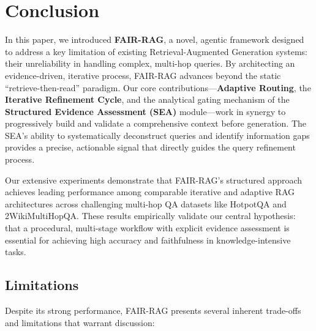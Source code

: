 \documentclass[11pt]{article}
\begin{document}
\section{Conclusion}

In this paper, we introduced \textbf{FAIR-RAG}, a novel, agentic framework designed to address a key limitation of existing Retrieval-Augmented Generation systems: their unreliability in handling complex, multi-hop queries. By architecting an evidence-driven, iterative process, FAIR-RAG advances beyond the static ``retrieve-then-read'' paradigm. Our core contributions---\textbf{Adaptive Routing}, the \textbf{Iterative Refinement Cycle}, and the analytical gating mechanism of the \textbf{Structured Evidence Assessment (SEA)} module---work in synergy to progressively build and validate a comprehensive context before generation. The SEA's ability to systematically deconstruct queries and identify information gaps provides a precise, actionable signal that directly guides the query refinement process.

Our extensive experiments demonstrate that FAIR-RAG's structured approach achieves leading performance among comparable iterative and adaptive RAG architectures across challenging multi-hop QA datasets like HotpotQA and 2WikiMultiHopQA. These results empirically validate our central hypothesis: that a procedural, multi-stage workflow with explicit evidence assessment is essential for achieving high accuracy and faithfulness in knowledge-intensive tasks.

\subsection{Limitations}

Despite its strong performance, FAIR-RAG presents several inherent trade-offs and limitations that warrant discussion:
\end{document}
